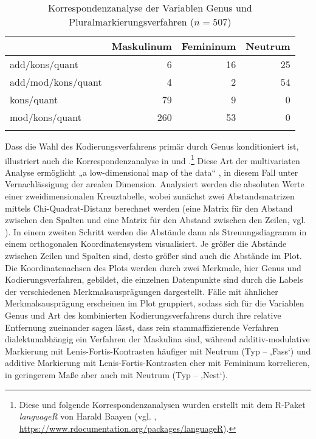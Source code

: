 \begin{table}[p]
\begin{tabular}{lrrr}
\lsptoprule
     &  Maskulinum & Femininum & Neutrum\\
     \midrule
     add/kons/quant & 6 & 16 & 25\\
     add/mod/kons/quant & 4 & 2 & 54\\
     kons/quant & 79 & 9 & 0\\
     mod/kons/quant & 260 & 53 & 0\\
     \lspbottomrule
\end{tabular}
\caption{Korrespondenzanalyse der Variablen Genus und Pluralmarkierungsverfahren ($n=507$)}
\label{tabfig:7}
\end{table}


Dass die Wahl des Kodierungsverfahrens primär durch Genus konditioniert ist, illustriert auch die Korrespondenzanalyse in   und .\footnote{Diese und folgende Korrespondenzanalysen wurden erstellt mit dem R-Paket \textit{languageR} von Harald Baayen (vgl. \citealt{Baayen2015}, \url{https://www.rdocumentation.org/packages/languageR}).} Diese Art der multivariaten Analyse ermöglicht „a low-dimensional map of the data“ \citep[129]{Baayen2015}, in diesem Fall unter Vernachlässigung der arealen Dimension. Analysiert werden die absoluten Werte einer zweidimensionalen Kreuztabelle, wobei zunächst zwei Abstandsmatrizen mittels Chi-Quadrat-Distanz berechnet werden (eine Matrix für den Abstand zwischen den Spalten und eine Matrix für den Abstand zwischen den Zeilen, vgl. \citealt[129--136]{Baayen2015}). In einem zweiten Schritt werden die Abstände dann als Streuungsdiagramm in einem orthogonalen Koordinatensystem visualisiert. Je größer die Abstände zwischen Zeilen und Spalten sind, desto größer sind auch die Abstände im Plot. Die Koordinatenachsen des Plots werden durch zwei Merkmale, hier Genus und Kodierungsverfahren, gebildet, die einzelnen Datenpunkte sind durch die Labels der verschiedenen Merkmalsausprägungen dargestellt. Fälle mit ähnlicher Merkmalsausprägung erscheinen im Plot gruppiert, sodass sich für die Variablen Genus und Art des kombinierten Kodierungsverfahrens durch ihre relative Entfernung zueinander sagen lässt, dass rein stammaffizierende Verfahren dialektunabhängig ein Verfahren der Maskulina sind, während additiv-modulative Markierung mit Lenis-Fortis-Kontrasten häufiger mit Neutrum (Typ  --  ‚Fass‘) und additive Markierung mit Lenis-Fortis-Kontrasten eher mit Femininum korrelieren, in geringerem Maße aber auch mit Neutrum (Typ  --  ‚Nest‘).

